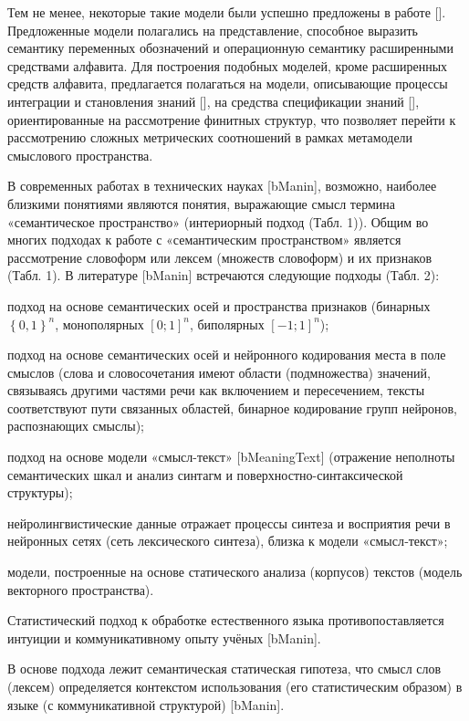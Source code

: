 Тем не менее, некоторые такие модели были успешно предложены в работе []. Предложенные модели полагались на представление, способное выразить семантику переменных обозначений и операционную семантику расширенными средствами алфавита. Для построения подобных моделей, кроме расширенных средств алфавита, предлагается полагаться на модели, описывающие процессы интеграции и становления знаний [], на средства спецификации знаний [], ориентированные на рассмотрение финитных структур, что позволяет перейти к рассмотрению сложных метрических соотношений в рамках метамодели смыслового пространства.

В современных работах в технических науках [bManin], возможно, наиболее близкими понятиями являются понятия, выражающие смысл термина «семантическое пространство» (интериорный подход (Табл. 1)).
Общим во многих подходах к работе с «семантическим пространством» является рассмотрение словоформ или лексем (множеств словоформ) и их признаков (Табл. 1). В литературе [bManin] встречаются следующие подходы (Табл. 2):
\begin{textitemize}
	\item подход на основе семантических осей и пространства признаков (бинарных $\left\lbrace 0,1\right\rbrace ^{n}$, монополярных $\left[0;1\right]^{n}$, биполярных $\left[-1;1\right]^{n}$);
	\item подход на основе семантических осей и нейронного кодирования места в поле смыслов (слова и словосочетания имеют области (подмножества) значений, связываясь другими частями речи как включением и пересечением, тексты соответствуют пути связанных областей, бинарное кодирование групп нейронов, распознающих смыслы);
	\item подход на основе модели «смысл-текст» [bMeaningText] (отражение неполноты семантических шкал и анализ синтагм и поверхностно-синтаксической структуры);
	\item нейролингвистические данные отражает процессы синтеза и восприятия речи в нейронных сетях (сеть лексического синтеза), близка к модели «смысл‑текст»;
	\item модели, построенные на основе статического анализа (корпусов) текстов (модель векторного пространства).
\end{textitemize}
Статистический подход к обработке естественного языка противопоставляется интуиции и коммуникативному опыту учёных [bManin].

В основе подхода лежит семантическая статическая гипотеза, что смысл слов (лексем) определяется контекстом использования (его статистическим образом) в языке (с коммуникативной структурой) [bManin].


